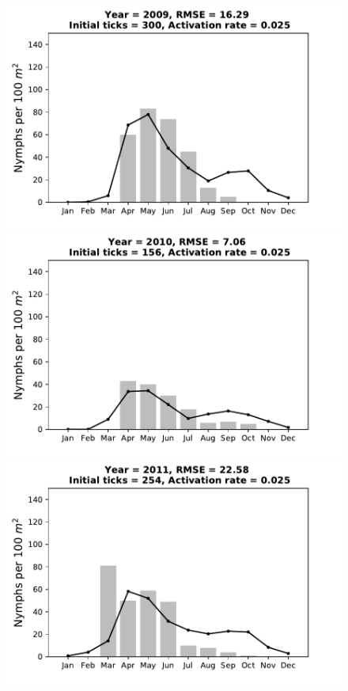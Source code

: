 \documentclass[a4paper, 11pt]{scrartcl}
\begin{document}
\begin{figure}[h!]
\centering
\begin{minipage}[c]{0.40\linewidth}
\includegraphics[width=\linewidth]{figures/s2/S2_2009}
\end{minipage}
\begin{minipage}[c]{0.40\linewidth}
\includegraphics[width=\linewidth]{figures/s2/S2_2010}
\end{minipage}
\begin{minipage}[c]{0.40\linewidth}
\includegraphics[width=\linewidth]{figures/s2/S2_2011}

\end{minipage}
\end{figure}
\end{document}
